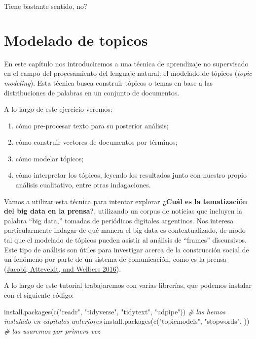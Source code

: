 \documentclass[
]{book}
\newenvironment{Shaded}{\begin{snugshade}}{\end{snugshade}}
\newcommand{\CommentTok}[1]{\textcolor[rgb]{0.56,0.35,0.01}{\textit{#1}}}
\newcommand{\FunctionTok}[1]{\textcolor[rgb]{0.00,0.00,0.00}{#1}}
\newcommand{\NormalTok}[1]{#1}
\newcommand{\StringTok}[1]{\textcolor[rgb]{0.31,0.60,0.02}{#1}}
\providecommand{\tightlist}{%
  \setlength{\itemsep}{0pt}\setlength{\parskip}{0pt}}
\begin{document}
Tiene bastante sentido, no?

\hypertarget{modelado-de-topicos}{%
\chapter{Modelado de topicos}\label{modelado-de-topicos}}

En este capítulo nos introduciremos a una técnica de aprendizaje no supervisado en el campo del procesamiento del lenguaje natural: el modelado de tópicos (\emph{topic modeling}). Esta técnica busca construir tópicos o temas en base a las distribuciones de palabras en un conjunto de documentos.

A lo largo de este ejercicio veremos:

\begin{enumerate}
\def\labelenumi{\arabic{enumi}.}
\tightlist
\item
  cómo pre-procesar texto para su posterior análisis;
\item
  cómo construir vectores de documentos por términos;
\item
  cómo modelar tópicos;
\item
  cómo interpretar los tópicos, leyendo los resultados junto con nuestro propio análisis cualitativo, entre otras indagaciones.
\end{enumerate}

Vamos a utilizar esta técnica para intentar explorar \textbf{¿Cuál es la tematización del big data en la prensa?}, utilizando un corpus de noticias que incluyen la palabra ``big data,'' tomadas de periódicos digitales argentinos. Nos interesa particularmente indagar de qué manera el big data es contextualizado, de modo tal que el modelado de tópicos pueden asistir al análisis de ``frames'' discursivos. Este tipo de análisis son útiles para investigar acerca de la construcción social de un fenómeno por parte de un sistema de comunicación, como es la prensa (\protect\hyperlink{ref-Jacobi2016}{Jacobi, Atteveldt, and Welbers 2016}).

A lo largo de este tutorial trabajaremos con varias librerías, que podemos instalar con el siguiente código:

\begin{Shaded}
\begin{Highlighting}[]
\FunctionTok{install.packages}\NormalTok{(}\FunctionTok{c}\NormalTok{(}\StringTok{"readr"}\NormalTok{, }\StringTok{"tidyverse"}\NormalTok{, }\StringTok{"tidytext"}\NormalTok{, }\StringTok{"udpipe"}\NormalTok{)) }\CommentTok{\# las hemos instalado en capítulos anteriores}
\FunctionTok{install.packages}\NormalTok{(}\FunctionTok{c}\NormalTok{(}\StringTok{"topicmodels"}\NormalTok{, }\StringTok{"stopwords"}\NormalTok{, )) }\CommentTok{\# las usaremos por primera vez}
\end{Highlighting}
\end{Shaded}
\end{document}
